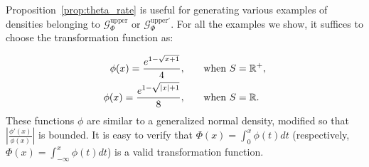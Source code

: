 \documentclass{article}
\begin{document}
Proposition~\ref{prop:theta_rate} is useful for generating various examples of densities belonging to $\mathcal{G}_{\Phi}^{\textrm{upper}}$ or $\mathcal{G}^{\textrm{upper} \prime}_{\Phi}$. For all the examples we show, it suffices to choose the transformation function as:

\begin{align}
\phi(x) = \frac{e^{1-\sqrt{x+1}}}{4},  & 
     \qquad \textrm{when $S = {\mathbb R}^+$}, \label{eqn:phi_defn1} \\ 
\phi(x) = \frac{e^{1-\sqrt{|x|+1}}}{8}, & 
                                          \qquad \textrm{when $S = {\mathbb R}$.} \label{eqn:phi_defn2}
\end{align}
These functions $\phi$ are similar to a generalized normal density, modified so that $\left| \frac{\phi'(x)}{\phi(x)} \right|$ is bounded. It is easy to verify that $\Phi(x) = \int_0^x \phi(t) dt$ (respectively, $\Phi(x) = \int_{-\infty}^x \phi(t) dt$) is a valid transformation function.
\end{document}
